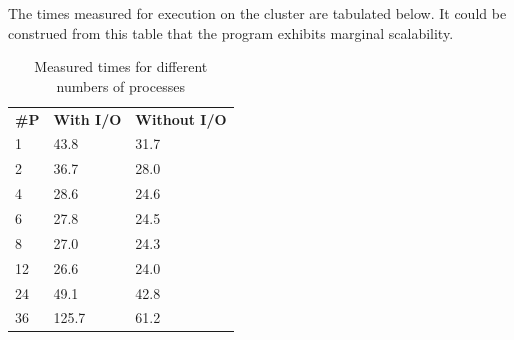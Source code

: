 \documentclass[sprache=english,fontsize=11,hausschrift=times,betreuerform=tabelle]{TUBAFarbeiten}
\begin{document}
\vfill
\newpage
The times measured for execution on the cluster are tabulated below. It could be 
construed from this table that the program exhibits marginal scalability.
\begin{table}[]
    \centering
    \begin{tabular}{lll}
    \textbf{\#P} & \textbf{With I/O} & \textbf{Without I/O} \\
    1            & 43.8              & 31.7                 \\
    2            & 36.7              & 28.0                 \\
    4            & 28.6              & 24.6                 \\
    6            & 27.8              & 24.5                 \\
    8            & 27.0              & 24.3                 \\
    12           & 26.6              & 24.0                 \\
    24           & 49.1              & 42.8                 \\
    36           & 125.7             & 61.2                
    \end{tabular}
    \caption{Measured times for different numbers of processes}
    \label{tab:time}
    \end{table}
\end{document}
